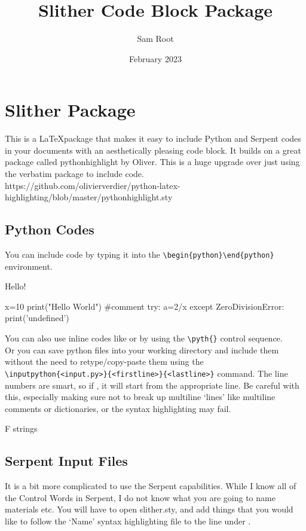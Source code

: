 \documentclass{article}
\title{Slither Code Block Package}
\author{Sam Root}
\date{February 2023}
\begin{document}
\section*{Slither Package}
This is a \LaTeX package that makes it easy to include Python and Serpent  codes in your documents with an aesthetically pleasing code block. It builds on a great package called pythonhighlight by Oliver. This is a huge upgrade over just using the verbatim package to include code. \\

https://github.com/olivierverdier/python-latex-highlighting/blob/master/pythonhighlight.sty


\subsection*{Python Codes}
You can include code by typing it into the \verb|\begin{python}\end{python}| environment.

\begin{code}\caption{Hello!} \begin{python}
    x=10
    print("Hello World") #comment
    try:
        a=2/x
    except ZeroDivisionError:
        print('undefined')
\end{python}\label{code:hello}\end{code}

You can also use inline codes like  or  by using the \verb|\pyth{}| control sequence. \\

Or you can save python files into your working directory and include them without the need to retype/copy-paste them using the \\ \verb|\inputpython{<input.py>}{<firstline>}{<lastline>}| command. The line numbers are smart, so if , it will start from the appropriate line. Be careful with this, especially making sure not to break up multiline `lines' like multiline comments or dictionaries, or the syntax highlighting may fail. 

\begin{code}\caption{F strings}
\label{code:fstrings}\end{code}

\newpage
\subsection*{Serpent Input Files}
It is a bit more complicated to use the Serpent capabilities. While I know all of the Control Words in Serpent, I do not know what you are going to name materials etc. You will have to open slither.sty, and add things that you would like to follow the `Name' syntax highlighting file to the line under .
\end{document}
